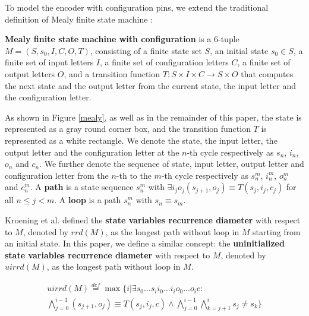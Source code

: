 \documentclass{acm_proc_article-sp}
\begin{document}
To model the encoder with configuration pins,
we extend the traditional definition of Mealy finite state machine \cite{MEALY}:

\begin{definition11}\label{MealyFSM}%
\textbf{Mealy finite state machine with configuration} is a 6-tuple $M=(S,s_0,I,C,O,T)$,
consisting of a finite state set $S$,
an initial state $s_0\in S$,
a finite set of input letters $I$,
a finite set of configuration letters $C$,
a finite set of output letters $O$,
and a transition function $T: S\times I\times C\to S\times O$ that computes the next state
and the output letter from the current state,
the input letter and the configuration letter.
\end{definition11}

As shown in Figure \ref{mealy},
as well as in the remainder of this paper,
the state is represented as a gray round corner box,
and the transition function $T$ is represented as a white rectangle.
We denote the state, the input letter, the output letter and the configuration letter at the $n$-th cycle respectively as $s_n$, $i_n$, $o_n$ and $c_n$.
We further denote the sequence of state, input letter, output letter and configuration letter from the $n$-th to the $m$-th cycle respectively as $s_n^m$, $i_n^m$, $o_n^m$ and $c_n^m$.
A \textbf{path} is a state sequence $s_n^{m}$ with $\exists i_jo_j (s_{j+1},o_j)\equiv T(s_j,i_j,c_j)$ for all $n\le j< m$.
A \textbf{loop} is a path $s_n^{m}$ with $s_n\equiv s_m$.

Kroening et al. \cite{RecDiam} defined the \textbf{state variables recurrence diameter} with respect to $M$,
denoted by $rrd(M)$,
as the longest path without loop in $M$ starting from an initial state.
In this paper,
we define a similar concept: the \textbf{uninitialized state variables recurrence diameter} with respect to $M$,
denoted by $uirrd(M)$,
as the longest path without loop in $M$.

\begin{equation}\label{equ_uisvrd}
\begin{split}
uirrd(M)\stackrel{def}{=}\max\{i|\exists s_0 \dots s_i  i_0 \dots i_i o_0 \dots o_ic:\\
\bigwedge^{i-1}_{j=0}(s_{j+1},o_j)\equiv T(s_j,i_j,c)\wedge\bigwedge^{i-1}_{j=0}\bigwedge^{i}_{k=j+1}s_{j}\ne s_{k}\}
\end{split}
\end{equation}
\end{document}

